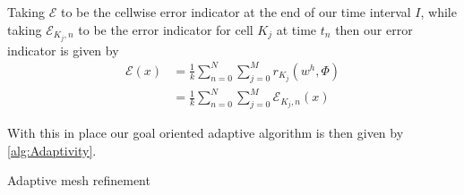 Taking $\mathcal{E}$ to be the cellwise error indicator at the end of our time
interval $I$, while taking $\mathcal{E}_{K_j, n}$ to be
the error indicator for cell $K_j$ at time $t_n$ then our error indicator is
given by
\begin{equation}
    \begin{split}
    \mathcal{E}(x) &= \frac{1}{k} \sum_{n=0}^N \sum_{j=0}^M r_{K_j}(w^h, \Phi) \\
                &= \frac{1}{k} \sum_{n=0}^N \sum_{j=0}^M \mathcal{E}_{K_j, n}(x)
    \end{split}
    \label{eq:ErrorIndicator}
\end{equation}

With this in place our goal oriented adaptive algorithm is then given by
\autoref{alg:Adaptivity}.
\begin{algorithm}[!htp]
  \caption{Adaptive mesh refinement} \label{alg:Adaptivity}
\begin{minipage}[t]{\columnwidth} %
  \SetAlgoLined
\end{minipage}
\end{algorithm}
